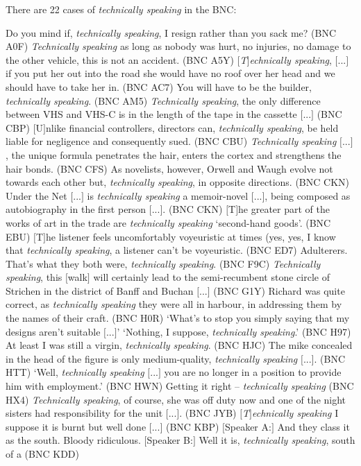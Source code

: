 There are 22 cases of \textit{technically speaking} in the BNC:

\begin{exe}
\ex
\begin{xlist} 
\label{ex:technicallyspeaking}
\ex Do you mind if, \textit{technically speaking}, I resign rather than you sack me? (BNC A0F) %
\ex \textit{Technically speaking} as long as nobody was hurt, no injuries, no damage to the other vehicle, this is not an accident. (BNC A5Y) %
\ex \textit{$[$T$]$echnically speaking}, $[$...$]$ if you put her out into the road she would have no roof over her head and we should have to take her in. \footnotesize{(BNC AC7)} %
\ex You will have to be the builder, \textit{technically speaking}. (BNC AM5) %
\ex \textit{Technically speaking}, the only difference between VHS and VHS-C is in the length of the tape in the cassette $[$...$]$ (BNC CBP) %
\ex $[$U$]$nlike financial controllers, directors can, \textit{technically speaking}, be held liable for negligence and consequently sued. (BNC CBU) %
\ex \textit{Technically speaking} $[$...$]$, the unique formula penetrates the hair, enters the cortex and strengthens the hair bonds. (BNC CFS) %
\ex As novelists, however, Orwell and Waugh evolve not towards each other but, \textit{technically speaking}, in opposite directions. (BNC CKN) %
\ex Under the Net $[$...$]$ is \textit{technically speaking} a memoir-novel $[$...$]$, being composed as autobiography in the first person $[$...$]$. \footnotesize{(BNC CKN)} %
\ex $[$T$]$he greater part of the works of art in the trade are \textit{technically speaking} `second-hand goods'. (BNC EBU) %
\ex $[$T$]$he listener feels uncomfortably voyeuristic at times (yes, yes, I know that \textit{technically speaking}, a listener can't be voyeuristic. (BNC ED7) %
\ex  Adulterers. That's what they both were, \textit{technically speaking}. \footnotesize{(BNC F9C)} %
\ex \textit{Technically speaking}, this $[$walk$]$ will certainly lead to the semi\hyp{}recumbent stone circle of Strichen in the district of Banff and Buchan $[$...$]$ \footnotesize{(BNC G1Y)} %
\ex Richard was quite correct, as \textit{technically speaking} they were all in harbour, in addressing them by the names of their craft. (BNC H0R) %
\ex `What's to stop you simply saying that my designs aren't suitable $[$...$]$' `Nothing, I suppose, \textit{technically speaking}.' (BNC H97) %
\ex At least I was still a virgin, \textit{technically speaking}. (BNC HJC) %
\ex The mike concealed in the head of the figure is only medium-quality, \textit{technically speaking} $[$...$]$. (BNC HTT) %
\ex `Well, \textit{technically speaking} $[$...$]$ you are no longer in a position to provide him with employment.' (BNC HWN) %
\ex Getting it right -- \textit{technically speaking} (BNC HX4) %
\ex \textit{Technically speaking}, of course, she was off duty now and one of the night sisters had responsibility for the unit $[$...$]$. (BNC JYB) %
\ex \textit{$[$T$]$echnically speaking} I suppose it is burnt but well done $[$...$]$ \footnotesize{(BNC KBP)} %
\ex $[$Speaker A:$]$ And they class it as the south. Bloody ridiculous. $[$Speaker B:$]$ Well it is, \textit{technically speaking}, south of a (BNC KDD) %
\end{xlist}
\end{exe}
